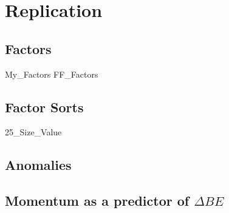 
\section{Replication} \label{sec:repl}

\subsection{\textcite{fama2016dissecting, fama2016choosing} Factors} \label{sec:repl.FF2016}

{My_Factors}
{FF_Factors}

\subsection{\textcite{fama2015five} Factor Sorts}

{25_Size_Value}

\subsection{\textcite{fama2016dissecting, fama2016choosing} Anomalies}

\subsection{\textcite{asness2013devil} Momentum as a predictor of $\Delta BE$}
